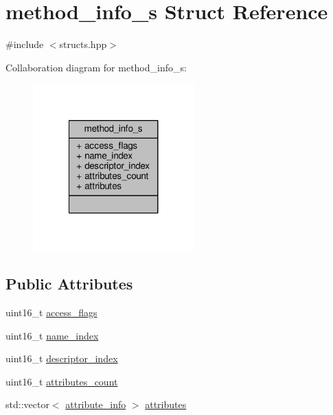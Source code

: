 \hypertarget{structmethod__info__s}{\section{method\+\_\+info\+\_\+s Struct Reference}
\label{structmethod__info__s}
}


{\ttfamily \#include $<$structs.\+hpp$>$}



Collaboration diagram for method\+\_\+info\+\_\+s\+:\nopagebreak
\begin{figure}[H]
\begin{center}
\leavevmode
\includegraphics[width=176pt]{structmethod__info__s__coll__graph}
\end{center}
\end{figure}
\subsection*{Public Attributes}
\begin{DoxyCompactItemize}
\item 
uint16\+\_\+t \hyperlink{structmethod__info__s_a062a031a987939214bf617101bce7435}{access\+\_\+flags}
\item 
uint16\+\_\+t \hyperlink{structmethod__info__s_ae7934a7245dbcbb518002309acbb53ae}{name\+\_\+index}
\item 
uint16\+\_\+t \hyperlink{structmethod__info__s_af93c8318d7968679bf177a79ca5df51b}{descriptor\+\_\+index}
\item 
uint16\+\_\+t \hyperlink{structmethod__info__s_afbbdab1523d8260e88ca3b0e09ad579d}{attributes\+\_\+count}
\item 
std\+::vector$<$ \hyperlink{attributes_8hpp_a7af51299ff517acce960ac87c9db9899}{attribute\+\_\+info} $>$ \hyperlink{structmethod__info__s_a4e4f4472bdd775cda7fdc50797defe66}{attributes}
\end{DoxyCompactItemize}


